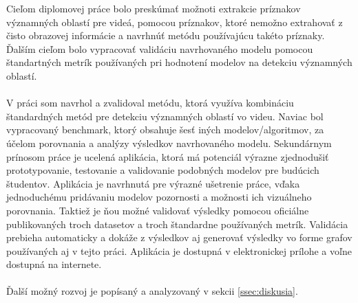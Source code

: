Cieľom diplomovej práce bolo preskúmať možnoti extrakcie príznakov významných oblastí pre videá, pomocou príznakov, ktoré nemožno extrahovať z čisto obrazovej informácie a navrhnúť metódu používajúcu takéto príznaky.
Ďalším cieľom bolo vypracovať validáciu navrhovaného modelu pomocou štandartných metrík používaných pri hodnotení modelov na detekciu významných oblastí.
\\
\\
V práci som navrhol a zvalidoval metódu, ktorá využíva kombináciu štandardných metód pre detekciu významných oblastí vo videu.
Naviac bol vypracovaný benchmark, ktorý obsahuje šesť iných modelov/algoritmov, za účelom porovnania a analýzy výsledkov navrhovaného modelu.
Sekundárnym prínosom práce je ucelená aplikácia, ktorá má potenciál výrazne zjednodušiť prototypovanie, testovanie a validovanie podobných modelov pre budúcich študentov.
Aplikácia je navrhnutá pre výrazné ušetrenie práce, vďaka jednoduchému pridávaniu modelov pozornosti a možnosti ich vizuálneho porovnania.
Taktiež je ňou možné validovať výsledky pomocou oficiálne publikovaných troch datasetov a troch štandardne používaných metrík.
Validácia prebieha automaticky a dokáže z výsledkov aj generovať výsledky vo forme grafov používaných aj v tejto práci.
Aplikácia je dostupná v elektronickej prílohe a voľne dostupná na internete.
\\
\\
Ďalší možný rozvoj je popísaný a analyzovaný v sekcii \ref{ssec:diskusia}.
